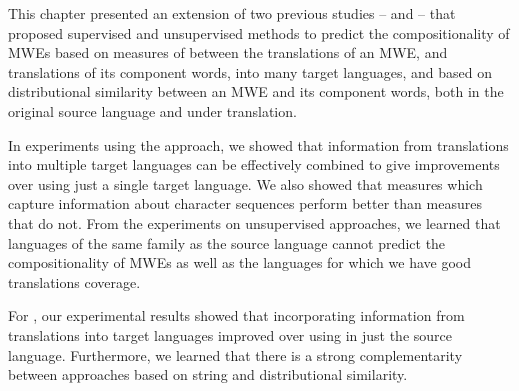 \documentclass[output=paper,modfonts,nonflat]{langsci/langscibook}
\begin{document}



This chapter presented an extension of two previous studies --
\cite{salehi2013} and \cite{DBLP:conf/eacl/SalehiCB14} -- that
proposed supervised and unsupervised methods to predict the
compositionality of MWEs based on measures of 
between the translations of an MWE, and translations of its component
words, into many target languages, and based on distributional
similarity between an MWE and its component words, both in the
original source language and under translation.

In experiments using the  approach, we showed that
information from translations into multiple target languages can be
effectively combined to give improvements over using just a single
target language. We also showed that  measures which
capture information about character sequences perform better than
measures that do not. From the experiments on unsupervised approaches,
we learned that languages of the same family as the source language
cannot predict the compositionality of MWEs as well as the languages
for which we have good translations coverage.

For , our experimental results showed that
incorporating information from translations into target languages
improved over using  in just the source
language. Furthermore, we learned that there is a strong
complementarity between approaches based on string and distributional
similarity.




\end{document}
